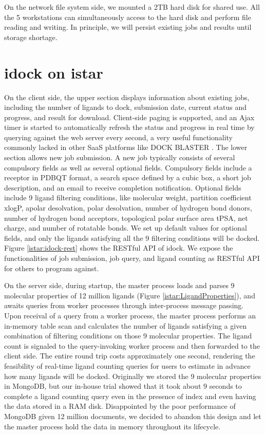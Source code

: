 \documentclass{bioinfo}
\begin{document}
On the network file system side, we mounted a 2TB hard disk for shared use. All the 5 workstations can simultaneously access to the hard disk and perform file reading and writing. In principle, we will persist existing jobs and results until storage shortage.

\section{idock on istar}

On the client side, the upper section displays information about existing jobs, including the number of ligands to dock, submission date, current status and progress, and result for download. Client-side paging is supported, and an Ajax timer is started to automatically refresh the status and progress in real time by querying against the web server every second, a very useful functionality commonly lacked in other SaaS platforms like DOCK BLASTER \citep{557}. The lower section allows new job submission. A new job typically consists of several compulsory fields as well as several optional fields. Compulsory fields include a receptor in PDBQT format, a search space defined by a cubic box, a short job description, and an email to receive completion notification. Optional fields include 9 ligand filtering conditions, like molecular weight, partition coefficient xlogP, apolar desolvation, polar desolvation, number of hydrogen bond donors, number of hydrogen bond acceptors, topological polar surface area tPSA, net charge, and number of rotatable bonds. We set up default values for optional fields, and only the ligands satisfying all the 9 filtering conditions will be docked. Figure \ref{istar:idock-rest} shows the RESTful API of idock. We expose the functionalities of job submission, job query, and ligand counting as RESTful API for others to program against.

On the server side, during startup, the master process loads and parses 9 molecular properties of 12 million ligands (Figure \ref{istar:LigandProperties}), and awaits queries from worker processes through inter-process message passing. Upon receival of a query from a worker process, the master process performs an in-memory table scan and calculates the number of ligands satisfying a given combination of filtering conditions on those 9 molecular properties. The ligand count is signaled to the query-invoking worker process and then forwarded to the client side. The entire round trip costs approximately one second, rendering the feasibility of real-time ligand counting queries for users to estimate in advance how many ligands will be docked. Originally we stored the 9 molecular properties in MongoDB, but our in-house trial showed that it took about 9 seconds to complete a ligand counting query even in the presence of index and even having the data stored in a RAM disk. Disappointed by the poor performance of MongoDB given 12 million documents, we decided to abandon this design and let the master process hold the data in memory throughout its lifecycle.
\end{document}

